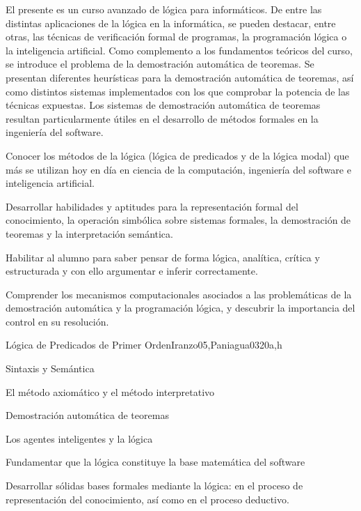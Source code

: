 \begin{syllabus}


\begin{justification}
El presente es un curso avanzado de lógica para informáticos. De
entre las distintas aplicaciones de la lógica en la informática, se
pueden destacar, entre otras, las técnicas de verificación formal de
programas, la programación lógica o la inteligencia artificial. Como
complemento a los fundamentos teóricos del curso, se introduce el
problema de la demostración automática de teoremas. Se presentan
diferentes heurísticas para la demostración automática de teoremas,
así como distintos sistemas implementados con los que comprobar la
potencia de las técnicas expuestas. Los sistemas de demostración
automática de teoremas resultan particularmente útiles en el
desarrollo de métodos formales en la ingeniería del software.
\end{justification}

\begin{goals}
\item Conocer los métodos de la lógica (lógica de predicados y de la lógica modal) que más se utilizan hoy en día en ciencia de la computación, ingeniería del software e inteligencia artificial. 
\item Desarrollar habilidades y aptitudes para la representación formal del conocimiento, la operación simbólica sobre sistemas formales, la demostración de teoremas y la interpretación semántica.
\item Habilitar al alumno para saber pensar de forma lógica, analítica, crítica y estructurada y con ello argumentar e inferir correctamente.
\item Comprender los mecanismos computacionales asociados a las problemáticas de la demostración automática y la programación lógica, y descubrir la importancia del control en su resolución.
\end{goals}


\begin{unit}{Lógica de Predicados de Primer Orden}{}{Iranzo05,Paniagua03}{20}{a,h}
   \begin{topics}
         \item  Sintaxis y Semántica
         \item  El método axiomático y el método interpretativo
         \item  Demostración automática de teoremas
         \item  Los agentes inteligentes y la lógica
   \end{topics}
   \begin{learningoutcomes}
         \item Fundamentar que la lógica constituye la base matemática del software
         \item Desarrollar sólidas bases formales mediante la lógica: en el proceso de representación del conocimiento, así como en el proceso deductivo.
   \end{learningoutcomes}
\end{unit}


\end{syllabus}
